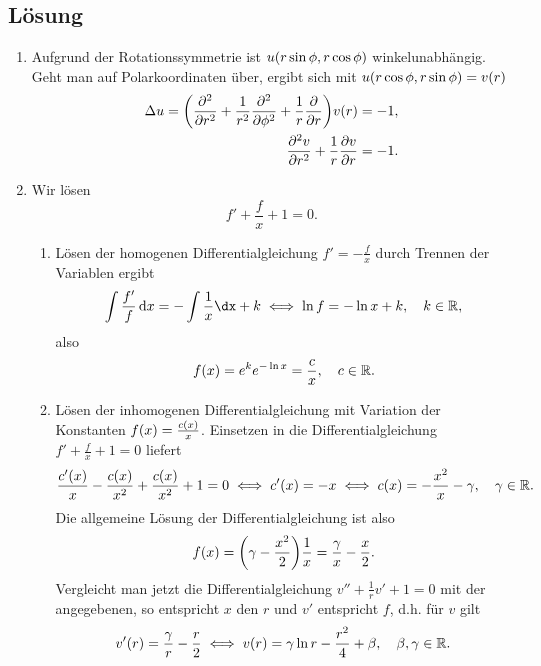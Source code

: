 \documentclass{exercise}
\begin{document}
    \subsection*{Lösung}
    \begin{enumerate}
        \item Aufgrund der Rotationssymmetrie ist \(u\parentheses*{r\sin\phi, r\cos\phi}\) winkelunabhängig.
        Geht man auf Polarkoordinaten über, ergibt sich mit \(u\parentheses*{r\cos\phi, r\sin\phi} = v\parentheses*{r}\)
        \begin{align*}
            \Delta u = \parentheses*{\frac{\partial^2}{\partial r^2} + \frac{1}{r^2}\frac{\partial^2}{\partial\phi^2} + \frac{1}{r}\frac{\partial}{\partial r}}v\parentheses*{r} &= -1,\\
            \frac{\partial^2 v}{\partial r^2} + \frac{1}{r}\frac{\partial v}{\partial r} &= -1.
        \end{align*}
        \item Wir lösen
        \[
            f' + \frac{f}{x} + 1 = 0.
        \]
        \begin{enumerate}
            \item Lösen der homogenen Differentialgleichung \(f' = -\frac{f}{x}\) durch Trennen der Variablen ergibt
            \[
                \int\frac{f'}{f}\d x = -\int\frac{1}{x}\dx + k \iff \ln f = -\ln x + k, \quad k \in \R,
            \]
            also
            \[
                f\parentheses*{x} = e^k e^{-\ln x} = \frac{c}{x}, \quad c \in \R.
            \]
            \item Lösen der inhomogenen Differentialgleichung mit Variation der Konstanten \(f\parentheses*{x} = \frac{c\parentheses*{x}}{x}\).
            Einsetzen in die Differentialgleichung \(f' + \frac{f}{x} + 1 = 0\) liefert
            \[
                \frac{c'\parentheses*{x}}{x} - \frac{c\parentheses*{x}}{x^2} + \frac{c\parentheses*{x}}{x^2} + 1 = 0 \iff c'\parentheses*{x} = -x \iff c\parentheses*{x} = -\frac{x^2}{x} - \gamma, \quad \gamma \in \R.
            \]
            Die allgemeine Lösung der Differentialgleichung ist also
            \[
                f\parentheses*{x} = \parentheses*{\gamma - \frac{x^2}{2}}\frac{1}{x} = \frac{\gamma}{x} - \frac{x}{2}.
            \]
            Vergleicht man jetzt die Differentialgleichung \(v'' + \frac{1}{r}v' + 1 = 0\) mit der angegebenen, so entspricht \(x\) den \(r\) und \(v'\) entspricht \(f\), d.h. für \(v\) gilt
            \[
                v'\parentheses*{r} = \frac{\gamma}{r} - \frac{r}{2} \iff v\parentheses*{r} = \gamma\ln r - \frac{r^2}{4} + \beta, \quad \beta, \gamma \in \R.
\]
\end{enumerate}
\end{enumerate}
\end{document}
